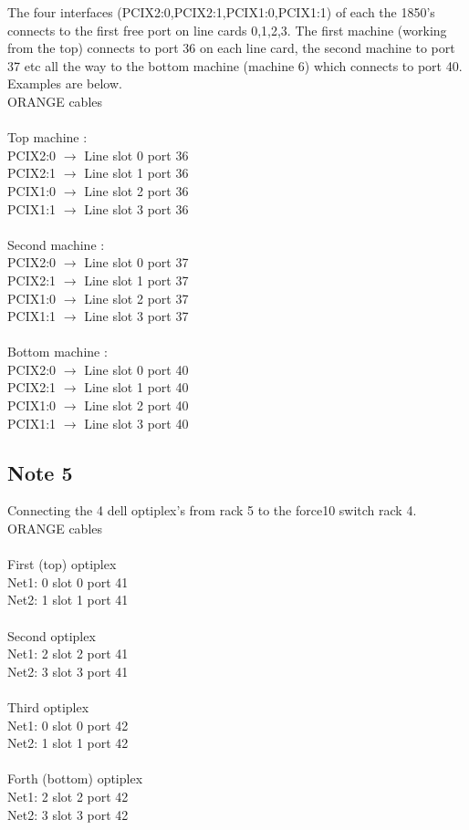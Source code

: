 \documentclass[a4paper]{article}
\begin{document}
The four interfaces (PCIX2:0,PCIX2:1,PCIX1:0,PCIX1:1) of each the
1850's connects to the first free port on line cards 0,1,2,3. The
first machine (working from the top) connects to port 36 on each line
card, the second machine to port 37 etc all the way to the bottom
machine (machine 6) which connects to port 40. Examples are below.
\\
ORANGE cables\\
\\
Top machine : \\
PCIX2:0 $\rightarrow$ Line slot 0 port 36\\
PCIX2:1 $\rightarrow$ Line slot 1 port 36\\
PCIX1:0 $\rightarrow$ Line slot 2 port 36\\
PCIX1:1 $\rightarrow$ Line slot 3 port 36\\
\\
Second machine :\\
PCIX2:0 $\rightarrow$ Line slot 0 port 37\\
PCIX2:1 $\rightarrow$ Line slot 1 port 37\\
PCIX1:0 $\rightarrow$ Line slot 2 port 37\\
PCIX1:1 $\rightarrow$ Line slot 3 port 37\\
\\
Bottom machine :\\
PCIX2:0 $\rightarrow$ Line slot 0 port 40\\
PCIX2:1 $\rightarrow$ Line slot 1 port 40\\
PCIX1:0 $\rightarrow$ Line slot 2 port 40\\
PCIX1:1 $\rightarrow$ Line slot 3 port 40\\

\subsection{Note 5}

Connecting the 4 dell optiplex's from rack 5 to the force10 switch rack 4.
\\
ORANGE cables\\
\\
First (top) optiplex \\
Net1: 0 slot 0 port 41\\
Net2: 1 slot 1 port 41\\
\\
Second optiplex\\
Net1: 2 slot 2 port 41\\
Net2: 3 slot 3 port 41\\
\\
Third optiplex\\
Net1: 0 slot 0 port 42\\
Net2: 1 slot 1 port 42\\
\\
Forth (bottom) optiplex\\
Net1: 2 slot 2 port 42\\
Net2: 3 slot 3 port 42\\
\end{document}
